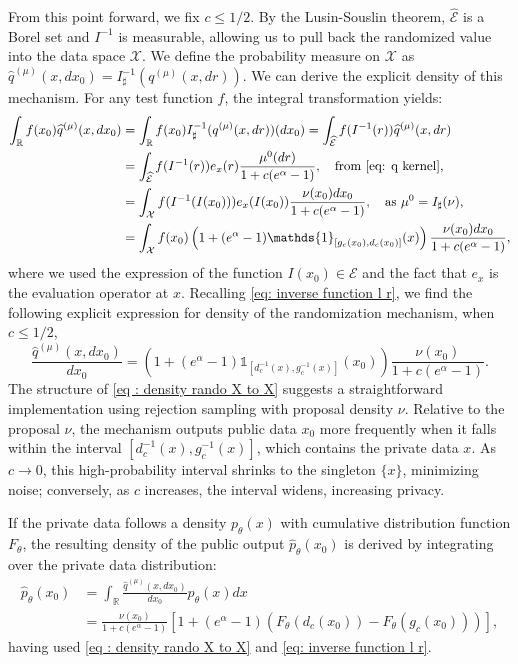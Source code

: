 \documentclass[a4paper, 11pt]{article}
\theoremstyle{definition}
\newcommand{\modar}{\color{black}}
\newcommand{\indi}[1]{\mathds{1}_{#1}}
\begin{document}
{From this point forward, we fix $c \le 1/2$. By the Lusin-Souslin theorem, $\widehat{\mathcal{E}}$ is a Borel set and $I^{-1}$ is measurable, allowing us to pull back the randomized value into the data space $\mathcal{X}$. We define the probability measure on $\mathcal{X}$ as $\widehat{q}^{(\mu)}(x,dx_0) = I^{-1}_\sharp(q^{(\mu)}(x,dr))$. We can derive the explicit density of this mechanism. For any test function $f$, the integral transformation yields:
\begin{align*}
\int_\mathbb{R}f(x_0)	\widehat{q}^{(\mu)}(x,dx_0) & =  
\int_\mathbb{R}f(x_0)	I^{-1}_\sharp(q^{(\mu)}(x,dr)) (dx_0)=
\int_\mathbb{\widehat{\mathcal{E}}}f(I^{-1}(r))	\widehat{q}^{(\mu)}(x,dr)
\\
&=
\int_\mathbb{\widehat{\mathcal{E}}}f(I^{-1}(r))	e_{x}(r) \frac{\mu^0(dr)}{1+c(e^\alpha-1)}, \quad \text{from \eqref{eq: q kernel},}
\\
&=
\int_\mathbb{\mathcal{X}}f(I^{-1}(I(x_0)))	e_x(I(x_0)) \frac{\nu(x_0)dx_0}{1+c(e^\alpha-1)},
\quad \text{as $\mu^0 = I_\sharp(\nu)$,}
\\
&=\int_\mathbb{\mathcal{X}}f(x_0) \left( 1+ (e^{\alpha}-1) \indi{[g_c(x_0),d_c(x_0)]}(x) \right) \frac{\nu(x_0)dx_0}{1+c(e^\alpha-1)},
\end{align*}
where we used the expression of the function $I(x_0) \in \mathcal{E}$ and the fact that $e_x$ is the evaluation operator at $x$.
Recalling \eqref{eq: inverse function l r}, we find the following explicit expression for density of the randomization mechanism, when $c \leq 1/2$,
\begin{equation}\label{eq : density rando X to X}
	\frac{\widehat{q}^{(\mu)}(x,dx_0)}{dx_0} = 
		 \left( 1+ (e^{\alpha}-1) \indi{[d_c^{-1}(x),g_c^{-1}(x)]}(x_0) \right) \frac{\nu(x_0)}{1+c(e^\alpha-1)}.
\end{equation}
The structure of \eqref{eq : density rando X to X} suggests a straightforward implementation using rejection sampling with proposal density $\nu$. Relative to the proposal $\nu$, the mechanism outputs public data $x_0$ more frequently when it falls within the interval $[d_c^{-1}(x),g_c^{-1}(x)]$, which contains the private data $x$. As $c \to 0$, this high-probability interval shrinks to the singleton $\{x\}$, minimizing noise; conversely, as $c$ increases, the interval widens, increasing privacy.

If the private data follows a density $p_\theta(x)$ with cumulative distribution function $F_\theta$, the resulting density of the public output $\widehat{p}_\theta(x_0)$ is derived by integrating over the private data {\modar distribution}:
\begin{align*}
	\widehat{p}_\theta(x_0)&=\int_\mathbb{R}	\frac{\widehat{q}^{(\mu)}(x,dx_0)}{dx_0} p_\theta(x)dx
	\\
	&= \frac{\nu(x_0)}{1+c(e^\alpha-1)} \left[1+(e^\alpha-1)(F_\theta(d_c(x_0)) - F_\theta(g_c(x_0))) \right],
\end{align*}
having used \eqref{eq : density rando X to X} and \eqref{eq: inverse function l r}.

}
\end{document}
